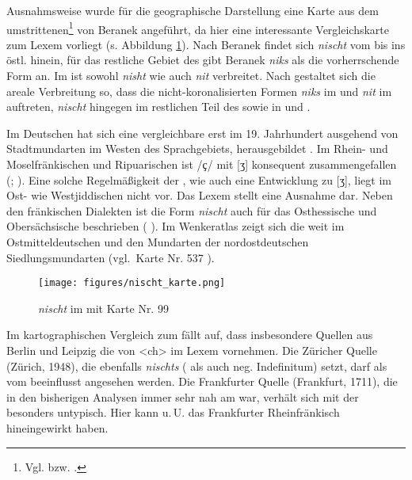 {  
Ausnahmsweise wurde für die geographische Darstellung eine Karte aus dem umstrittenen\footnote{Vgl. \textcite{GuggenheimGruenberg1966b} bzw. \textcite{GuggenheimGruenberg1968}.}  von Beranek angeführt, da hier eine interessante Vergleichskarte zum Lexem  vorliegt (s. Abbildung \ref{kartenischt}). Nach Beranek findet sich \textit{nischt} vom  bis ins östl. \hai{{\NWJ}} hinein, für das restliche Gebiet des \hai{{\WJ}} gibt Beranek \textit{niks} als die vorherrschende Form an. Im \hai{{\OJ}} ist sowohl  \textit{nisht} wie auch  \textit{nit} verbreitet. Nach \cite[375]{Bin-Nun1973} gestaltet sich die areale Verbreitung so, dass die nicht-koronalisierten Formen \textit{niks} im  und \textit{nit} im \hai{{\NOJ}} auftreten, \textit{nischt} hingegen im restlichen Teil des \hai{{\WJ}} sowie in \hai{{\ZOJ}} und \hai{{\SOJ}}. 

Im Deutschen hat sich eine vergleichbare  erst im 19. Jahrhundert ausgehend von Stadtmundarten im Westen des Sprachgebiets,   herausgebildet \parencite[97–101]{Herrgen1986}. Im Rhein- und Moselfränkischen und Ripuarischen ist /ҫ/ mit  [ʒ] konsequent zusammengefallen (\citealt[275]{Schirmunski1962}; \citealt{Herrgen1986}). Eine solche Regelmäßigkeit der , wie auch eine Entwicklung zu  [ʒ], liegt im Ost- wie Westjiddischen nicht vor. Das Lexem  stellt eine Ausnahme dar. Neben den fränkischen Dialekten ist die Form \textit{nischt} auch für das Osthessische und Obersächsische beschrieben ( \citeyear[Bd. 13, Sp. 729]{DeutschesWB}). Im Wenkeratlas zeigt sich die  weit im Ostmitteldeutschen und den Mundarten der nordostdeutschen Siedlungsmundarten (vgl.\,  Karte Nr. 537 ).

 \begin{figure}
		\centering
\texttt{[image: figures/nischt\_karte.png]}
		\caption{\label{kartenischt} \textit{nischt} im  mit  Karte Nr. 99}
		\end{figure}

		
 Im kartographischen Vergleich zum  fällt auf, dass insbesondere Quellen aus Berlin und Leipzig die  von <ch> im Lexem  vornehmen. Die Züricher Quelle  (Zürich, 1948), die ebenfalls \textit{nischts} ( als auch neg. Indefinitum) setzt, darf als vom \hai{{\OJ}} beeinflusst angesehen werden. Die Frankfurter Quelle  (Frankfurt, 1711), die in den bisherigen Analysen immer sehr nah am \hai{{\WJ}} war, verhält sich mit der  besonders untypisch. Hier kann u.\,U. das Frankfurter Rheinfränkisch hineingewirkt haben.


}
